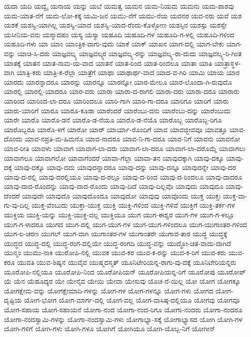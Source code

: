 ಯದಾ
ಯದಿ
ಯದ್ವೈ
ಯನಾಯ
ಯನ್ನು
ಯಬೆ
ಯಮತ್ವ
ಯಮನ
ಯಮ-ನಿಯಮ
ಯಮನು
ಯಮ-ಪಾಶವು
ಯಮ-ಯಾತ-ನೆಗೆ
ಯಮ-ಲೋ-ಕಕ್ಕೆ
ಯಮಿ-ಜನ
ಯಮು-ನೆಗೆ
ಯಮು-ನೆಯ
ಯವನರ
ಯವ-ನರು
ಯವೆ
ಯಶ
ಯಶಕೆ
ಯಶಸ್ವಿ-ಯಾಗಿಲ್ಲ
ಯಶಸ್ವಿ-ಯಾದ
ಯಶಸ್ವಿ-ಯಾದ-ರೆಂದು-ಕೊಳ್ಳೋಣ
ಯಶಸ್ಸಿನ
ಯಶಸ್ಸು
ಯಶಸ್ಸೇ
ಯಸೀನಿಯ-ವನು
ಯಸ್ಮಾದಹಂ
ಯಸ್ಯ
ಯಸ್ಯಾ
ಯಹೂದಿ
ಯಹೂದಿ-ಗಳ
ಯಹೂದಿ-ಗ-ಳಲ್ಲಿ
ಯಹೂದಿ-ಗಳಿಂದ
ಯಹೂದಿ-ಗಳು
ಯಾ
ಯಾಂ
ಯಾಂತ್ರಿಕ-ವಾಗು-ವುದು
ಯಾಕೆ
ಯಾಕ್
ಯಾಖನ
ಯಾಗ-ದಲ್ಲಿ
ಯಾಗ-ಬೇಕು
ಯಾಗ-ವನ್ನು
ಯಾಚಿ-ಸಿ-ದರು
ಯಾಜ್ಞವಲ್ಕ್ಯ
ಯಾಜ್ಞವಲ್ಕ್ಯರ
ಯಾಜ್ಞವಲ್ಕ್ಯ-ರನ್ನು
ಯಾಜ್ಞವಲ್ಕ್ಯ-ರಾ-ದುದು
ಯಾಜ್ಞವಲ್ಕ್ಯ-ರಿ-ಗಿಂತ
ಯಾತಕ್ಕೆ
ಯಾತನ
ಯಾತ-ನಾಮ-ಯ-ವಾದ
ಯಾತನೆ
ಯಾತ-ರಿಂದ
ಯಾತ-ರಿಂದಲೂ
ಯಾತಾ
ಯಾತಿ
ಯಾತ್ರಾಸ್ಥಳ-ವಾಗಿ
ಯಾತ್ರಿ-ಕರು
ಯಾತ್ರಿ-ಕ-ರೆಲ್ಲಾ
ಯಾತ್ರೆಗೆ
ಯಾಥಾ
ಯಾಥಾರ್ಥ-ವಾದ
ಯಾದ-ವ-ಗಿರಿ
ಯಾಮಿ
ಯಾಯ
ಯಾರ
ಯಾರದು
ಯಾರನ್ನಾದರೂ
ಯಾರನ್ನು
ಯಾರನ್ನೂ
ಯಾರನ್ನೋ
ಯಾರ-ಮೇಲೂ
ಯಾರ-ಲೊಂದಾ-ಗಿ-ರುವುದೊ
ಯಾರಲ್ಲಿ
ಯಾರಲ್ಲಿ-ಯಾದರೂ
ಯಾರ-ವರು
ಯಾರಾ
ಯಾರಾ-ದ-ರಾಗಲಿ
ಯಾರಾ-ದರು
ಯಾರಾ-ದರೂ
ಯಾರಾರು
ಯಾರಿಂದ
ಯಾರಿಂದ-ಲಾ-ದರೂ
ಯಾರಿಂದಲೂ
ಯಾರಿ-ಗಾಗಿ
ಯಾರಿ-ಗಾ-ದರೂ
ಯಾರಿಗೂ
ಯಾರಿಗೆ
ಯಾರು
ಯಾರು-ಯಾರಿಗೆ
ಯಾರೂ
ಯಾರೂ-ಕೂಡಾ
ಯಾರೆಂದರೆ
ಯಾರೆಂಬು-ದನು
ಯಾರೆಂಬು-ದನ್ನು
ಯಾರೆಂಬುದು
ಯಾರೇ
ಯಾರೊ
ಯಾರೊ-ಡನೆ
ಯಾರೊ-ಡ-ನೆಯೂ
ಯಾರೊ-ಡ-ನೆಯೊ
ಯಾರೊಬ್ಬ
ಯಾರೊಬ್ಬ-ರಿಗೂ
ಯಾರೊಬ್ಬರೂ
ಯಾರೊ-ಳಗೆ
ಯಾರೋ
ಯಾರ್
ಯಾರ್ಯಾ-ರೊಂದಿಗೆ
ಯಾವ
ಯಾವಜ್ಜೀವವೂ
ಯಾವತ್ತೂ
ಯಾವ-ದೊಂದು
ಯಾವ-ನಪ್ರತಿ-ಮ-ಹಿಮನೊ
ಯಾವ-ನಾದರೂ
ಯಾವ-ನಿ-ಗಾ-ದರೂ
ಯಾವ-ನಿಗೆ
ಯಾವನು
ಯಾವನೋ
ಯಾವ-ರೀತಿ
ಯಾವಳು
ಯಾವಾಗ
ಯಾವಾಗ-ಲಾ-ದರು
ಯಾವಾಗ-ಲಾ-ದರೂ
ಯಾವಾಗ-ಲಾ-ದರೊಮ್ಮೆ
ಯಾವಾಗಲು
ಯಾವಾಗಲೂ
ಯಾವಾಗಲೋ
ಯಾವಾಗೆಂದರೆ
ಯಾವಾ-ಗೆಲ್ಲಾ
ಯಾವಾ-ತನ
ಯಾವುದಕ್ಕಾಗಿ
ಯಾವು-ದಕ್ಕೂ
ಯಾವು-ದಕ್ಕೆ
ಯಾವು-ದಕ್ಕೊ
ಯಾವು-ದದು
ಯಾವುದನ್ನಾದರೂ
ಯಾವು-ದನ್ನು
ಯಾವು-ದನ್ನೂ
ಯಾವುದನ್ನೇ
ಯಾವು-ದರ
ಯಾವು-ದ-ರಲ್ಲಿ
ಯಾವು-ದರಲ್ಲಿಯೂ
ಯಾವು-ದ-ರಲ್ಲೂ
ಯಾವು-ದ-ರಿಂದ
ಯಾವು-ದ-ರಿಂದಲೂ
ಯಾವು-ದಾದರೂ
ಯಾವು-ದಾದ-ರೊಂದನ್ನು
ಯಾವು-ದಾದ-ರೊಂದು
ಯಾವು-ದಿದೆ
ಯಾವು-ದಿಲ್ಲವೊ
ಯಾವುದು
ಯಾವುದೂ
ಯಾವು-ದೆಂದರೆ
ಯಾವುದೇ
ಯಾವುದೊ
ಯಾವುದೊಂದೂ
ಯಾವುದೋ
ಯಾವುವು
ಯಾವೊಂದು
ಯುಕ್ತ
ಯುಕ್ತಃ
ಯುಕ್ತ-ವಾ-ಗು-ವು-ದಿಲ್ಲ
ಯುಕ್ತ-ವೆಂಬುದು
ಯುಕ್ತಾ-ಯುಕ್ತ
ಯುಕ್ತಿ
ಯುಕ್ತಿ-ಗಳಿಂದ
ಯುಕ್ತಿ-ಗಳಿವೆ
ಯುಕ್ತಿಗೆ
ಯುಕ್ತಿ-ತರ್ಕ-ಗಳ
ಯುಕ್ತಿಯ
ಯುಕ್ತಿ-ಯನ್ನು
ಯುಕ್ತಿ-ಯುಕ್ತ-ವಲ್ಲ
ಯುಕ್ತಿಯೂ
ಯುಗ
ಯುಗ-ಈಶ್ವರ
ಯುಗ-ಗಳ
ಯುಗ-ಗ-ಳಲ್ಲೂ
ಯುಗ-ಗ-ಳಾದರೂ
ಯುಗದ
ಯುಗ-ದಲ್ಲಿ
ಯುಗ-ಯುಗ-ಗಳ
ಯುಗ-ಯುಗ-ಗಳಿಂದಲೂ
ಯುಗ-ಯುಗಾಂತರ-ಗಳಿಂದ
ಯುಗ-ಲ-ಚರಣ
ಯುಗಲ್
ಯುಗ-ವಾಗಿ
ಯುಗಾಂತರ-ಗಳ
ಯುಗಾಂತರೇ
ಯುಗಾವ-ತಾರ
ಯುದ್ಧ
ಯುದ್ಧಕ್ಕೆ
ಯುದ್ಧದ
ಯುದ್ಧ-ದಲ್ಲಿ
ಯುದ್ಧ-ರಂಗ-ದಲ್ಲಿಯೇ
ಯುದ್ಧ-ರಂಗದಿ
ಯುದ್ಧ-ವನ್ನು
ಯುದ್ಧೋ-ಚಿತ-ವಾದು-ದಾಗಿದೆ
ಯುನ್ಮಂ
ಯುಮು-ನಾಕಿ
ಯುರೋಪಿ-ನಲ್ಲಿ
ಯುವಕ
ಯುವ-ಕರ
ಯುವ-ಕ-ರನ್ನು
ಯುವ-ಕ-ರಿಗೆ
ಯುವ-ಕರು
ಯುವ-ಕರೂ
ಯುವತಿ
ಯುವ-ಶಿಷ್ಯನ
ಯುವೈವ
ಯುಷ್ಮದಸ್ಮತ್
ಯೂನಿಟೇರಿಯನ್ನ-ರಾಗು-ವು-ದಕ್ಕೆ
ಯೂನಿಟೇರಿಯನ್ನರು
ಯೂರೋಪಿ-ನಲ್ಲಿಯೂ
ಯೂರೋಪಿ-ನಿಂದ
ಯೂರೋಪಿಯನ್
ಯೂರೋಪಿಯನ್ನ-ರಿಗೆ
ಯೂರೋಪು
ಯೂರೋಪ್
ಯೆ
ಯೆನ
ಯೆಹೂದ್ಯರ
ಯೇ
ಯೇನೈವ
ಯೇಯಿ
ಯೇವಾ
ಯೇಸುವು
ಯೊಚ-ನೆ-ಯಿಲ್ಲ
ಯೋ
ಯೋಗ
ಯೋಗಕ್ಕೂ
ಯೋಗಕ್ಷೇಮ-ವನ್ನು
ಯೋಗಕ್ಷೇಮಾದಿ-ಗಳನ್ನು
ಯೋಗ-ಗಳ
ಯೋಗ-ಗಳನ್ನೂ
ಯೋಗ-ಗಳು
ಯೋಗದ
ಯೋಗ-ದೃಷ್ಟಿಯ
ಯೋಗ-ಭೋಗ
ಯೋಗ-ಮಾರ್ಗ-ದಲ್ಲಿ
ಯೋಗ-ವಲ್ಲ
ಯೋಗ-ವಾಸಿಷ್ಠ-ದಲ್ಲಿಯೂ
ಯೋಗವು
ಯೋಗವೂ
ಯೋಗ-ಸಹಾಯ
ಯೋಗ-ಸಹಾಯನೆ
ಯೋಗಾ-ನಂದ
ಯೋಗಾ-ನಂದ-ರಿಗೂ
ಯೋಗಾ-ನಂದರು
ಯೋಗಾ-ನಂದರೂ
ಯೋಗಾ-ನಂದಸ್ವಾಮಿ-ಗಳನ್ನು
ಯೋಗಾ-ನಂದಸ್ವಾಮಿ-ಗಳು
ಯೋಗಾಭ್ಯಾ-ಸಕ್ಕೆ
ಯೋಗಾಭ್ಯಾಸದ
ಯೋಗಿ
ಯೋಗಿ-ಗಳ
ಯೋಗಿ-ಗಳಿಗೆ
ಯೋಗಿ-ಗಳು
ಯೋಗಿ-ಗಳೂ
ಯೋಗಿಗೆ
ಯೋಗಿಯೂ
ಯೋಗಿ-ಯೊಬ್ಬ-ನಿಗೆ
ಯೋಗೀನ್
